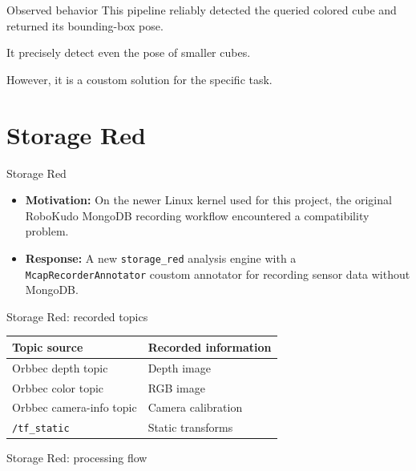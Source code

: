 \documentclass[aspectratio=169,11pt]{beamer}
\begin{document}
\begin{frame}{Observed behavior}
  This pipeline reliably detected the queried
  colored cube and returned its bounding-box pose.

  \medskip
  It precisely detect even the pose of smaller cubes.

  \medskip
  However, it is a coustom solution for the specific task.
\end{frame}

\section{Storage Red}

\begin{frame}{Storage Red}
  \begin{itemize}
    \setlength{\itemsep}{0.9cm}
    \item \textbf{Motivation:} On the newer Linux kernel used for this project,
      the original RoboKudo MongoDB recording workflow encountered a
      compatibility problem.
    \item \textbf{Response:} A new \texttt{storage\_red} 
      analysis engine with a \texttt{McapRecorderAnnotator} coustom annotator for recording sensor data without MongoDB.
  \end{itemize}
\end{frame}

\begin{frame}{Storage Red: recorded topics}
  \centering
  \footnotesize
  \setlength{\tabcolsep}{4pt}
  \renewcommand{\arraystretch}{1.45}
  \begin{tabular}{|>{\raggedright\arraybackslash}p{3.4cm}|>{\raggedright\arraybackslash}p{3.1cm}|}
    \hline
    \textbf{Topic source} & \textbf{Recorded information} \\
    \hline
    Orbbec depth topic & Depth image \\
    \hline
    Orbbec color topic & RGB image \\
    \hline
    Orbbec camera-info topic & Camera calibration \\
    \hline
    \texttt{/tf\_static} & Static transforms \\
    \hline
  \end{tabular}
\end{frame}

\begin{frame}{Storage Red: processing flow}
  \centering
\end{frame}
\end{document}

